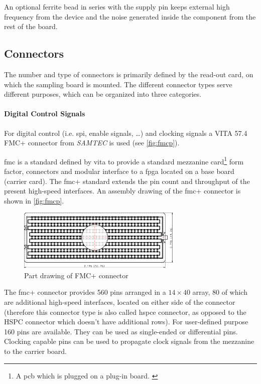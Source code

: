 An optional ferrite bead in series with the supply pin keeps external high frequency from the device and the noise generated inside the component from the rest of the board. \cite{decouple}


\subsection{Connectors}\label{sec:connectors}
The number and type of connectors is primarily defined by the read-out card, on which the sampling board is mounted.
The different connector types serve different purposes, which can be organized into three categories.

\paragraph{Digital Control Signals}
For digital control (i.e. \gls{spi}, enable signals, \ldots) and clocking signals a VITA 57.4 FMC+ connector from \textit{SAMTEC} is used (see \autoref{fig:fmcp}). 

\gls{fmc} is a standard defined by \gls{vita} to provide a standard mezzanine card\footnote{A \gls{pcb} which is plugged on a plug-in board. \cite{mezzanine}} form factor, connectors and modular interface to a \gls{fpga} located on a base board (carrier card). \cite{Seelam2009}
The \gls{fmc}+ standard extends the pin count and throughput of the present high-speed interfaces. 
An assembly drawing of the \gls{fmc}+ connector is shown in \autoref{fig:fmcp}.
\begin{figure}[tb]
	\centering
	\includegraphics[width = 0.7\textwidth]{chap/04-theresa/img/connectors/fmcp.pdf}
	\caption[Rendering of FMC+ connector]{Part drawing of FMC+ connector \cite{fmcpic}}
	\label{fig:fmcp}
\end{figure}

The \gls{fmc}+ connector provides 560 pins arranged in a $14\times40$ array, 80 of which are additional high-speed interfaces, located on either side of the connector (therefore this connector type is also called \gls{hspce} connector, as opposed to the HSPC connector which doesn't have additional rows).
For user-defined purpose 160 pins are available. 
They can be used as single-ended or differential pins.
Clocking capable pins can be used to propagate clock signals from the mezzanine to the carrier board. 


